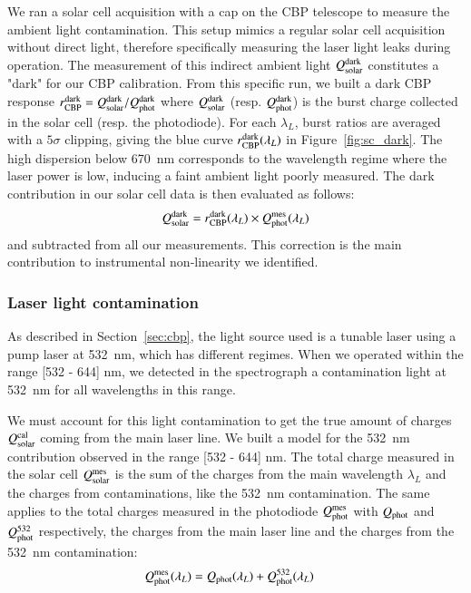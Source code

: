 We ran a solar cell acquisition with a cap on the CBP telescope to measure the ambient light contamination. This setup mimics a regular solar cell acquisition without direct light, therefore specifically measuring the laser light leaks during operation. The measurement of this indirect ambient light $Q_{\mathrm{solar}}^{\rm dark}$ constitutes a "dark" for our CBP calibration. From this specific run, we built a dark CBP response $r_{\mathrm{CBP}}^{\rm dark} = Q_{\mathrm{solar}}^{\rm dark} / Q_{\mathrm{phot}}^{\rm dark}$ where $Q_{\mathrm{solar}}^{\rm dark}$ (resp. $Q_{\mathrm{phot}}^{\rm dark}$) is the burst charge collected in the solar cell (resp. the photodiode). For each $\lambda_L$, burst ratios are averaged with a $5\sigma$ clipping, giving the blue curve $r_{\mathrm{CBP}}^{\rm dark}(\lambda_L)$ in Figure~\ref{fig:sc_dark}. The high dispersion below \SI{670}{\nano\meter} corresponds to the wavelength regime where the laser power is low, inducing a faint ambient light poorly measured. The dark contribution in our solar cell data is then evaluated as follows:
\begin{equation}
    Q_{\mathrm{solar}}^{\rm dark} = r_{\mathrm{CBP}}^{\rm dark}(\lambda_L) \times Q_{\mathrm{phot}}^{\mathrm{mes}}(\lambda_L)
\end{equation}
and subtracted from all our measurements. This correction is the main contribution to instrumental non-linearity we identified. 


\subsubsection{Laser light contamination}
\label{sec:532_cont}

As described in Section~\ref{sec:cbp}, the light source used is a tunable laser using a pump laser at \SI{532}{\nano\meter}, which has different regimes. When we operated within the range [532 - 644] nm, we detected in the spectrograph a contamination light at \SI{532}{\nano\meter} for all wavelengths in this range. 

We must account for this light contamination to get the true amount of charges $Q_{\mathrm{solar}}^{\mathrm{cal}}$ coming from the main laser line. We built a model for the \SI{532}{\nano\meter} contribution observed in the range [532 - 644] nm. The total charge measured in the solar cell $Q_{\mathrm{solar}}^{\mathrm{mes}}$ is the sum of the charges from the main wavelength $\lambda_L$ and the charges from contaminations, like the \SI{532}{\nm} contamination. The same applies to the total charges measured in the photodiode $Q_{\mathrm{phot}}^{\mathrm{mes}}$ with $Q_{\mathrm{phot}}$ and $Q_{\mathrm{phot}}^{532}$ respectively, the charges from the main laser line and the charges from the \SI{532}{\nm} contamination:
\begin{align}
Q_{\mathrm{phot}}^{\mathrm{mes}}(\lambda_L) & = Q_{\mathrm{phot}}(\lambda_L) + Q_{\mathrm{phot}}^{532}(\lambda_L) \label{eq:qphot_mes}
\end{align}

